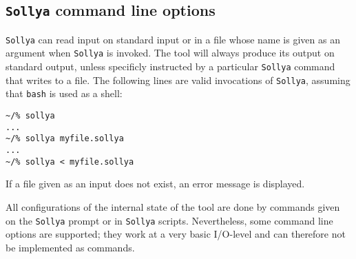 \documentclass[a4paper]{article}
\newcommand{\sollya}{\texttt{Sollya}\xspace}
\begin{document}
\subsection{\sollya command line options}

\sollya can read input on standard input or in a file whose name is given 
as an argument when \sollya is invoked. The tool will always produce its 
output on standard output, unless specificly instructed by a particular
\sollya command that writes to a file.
The following lines are valid invocations of \sollya, assuming that 
\texttt{bash} is used as a shell:
\begin{center}\begin{minipage}{15cm}\begin{Verbatim}[frame=single]
~/% sollya
...
~/% sollya myfile.sollya
...
~/% sollya < myfile.sollya
\end{Verbatim}
\end{minipage}\end{center}
If a file given as an input does not exist, an error message is displayed.

All configurations of the internal state of the tool are done by
commands given on the \sollya prompt or in \sollya
scripts. Nevertheless, some command line options are supported; they
work at a very basic I/O-level and can therefore not be implemented as
commands.
\end{document}
